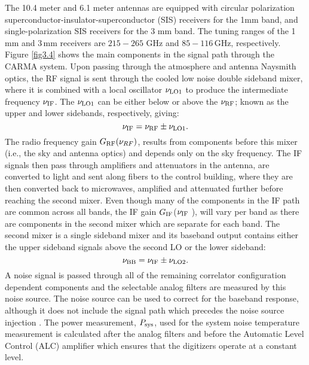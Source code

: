 The 10.4 meter and 6.1 meter antennas are equipped with circular polarization  superconductor-insulator-superconductor (SIS) receivers \citep{engargiola_2004} for the 1mm band, and single-polarization SIS receivers for the 3 mm band. The tuning ranges of the 1\,mm and 3\,mm receivers are $215-265$ GHz and $85-116$\,GHz, respectively. Figure \ref{fig3.4} shows the main components in the signal path through the CARMA system. Upon passing through the atmosphere and antenna Naysmith optics, the RF signal is sent through the cooled low noise double sideband mixer, where it is combined with a local oscillator $\nu _{\rm{LO1}}$ to produce the intermediate frequency $\nu _{\rm{IF}}$. The $\nu _{\rm{LO1}}$ can be either below or above the $\nu _{\rm{RF}}$; known as the upper and lower sidebands, respectively, giving:
\begin{equation}
\nu _{\rm{IF}}=\nu _{\rm{RF}}\pm \nu _{\rm{LO1}}.
\end{equation}
The radio frequency gain $G_{\rm{RF}}(\nu _{RF})$, results from components before this mixer (i.e., the sky and antenna optics) and depends only on the sky frequency. The IF signals then pass through amplifiers and attenuators in the antenna, are converted to light and sent along fibers to the control building, where they are then converted back to microwaves, amplified and attenuated further before reaching the second mixer. Even though many of the components in the IF path are common across all bands, the IF gain $G_{\rm{IF}}$($\nu _{\rm{IF}}$ ), will vary per band as there are components in the second mixer which are separate for each band. The second mixer is a single sideband mixer and its baseband output contains either the upper sideband signals above the second LO or the lower sideband:
\begin{equation}
\nu _{\rm{BB}} = \nu _{\rm{IF}} \pm \nu _{\rm{LO2}}.
\end{equation}
A noise signal is passed through all of the remaining correlator configuration dependent components and the selectable analog filters are measured by this noise source. The noise source can be used to correct for the baseband response, although it does not include the signal path which precedes the noise source injection \citep{wright_2009}. The power measurement, $P_{\rm{sys}}$, used for the system noise temperature measurement is calculated after the analog filters and before the Automatic Level Control (ALC) amplifier which ensures that the digitizers operate at a constant level.

